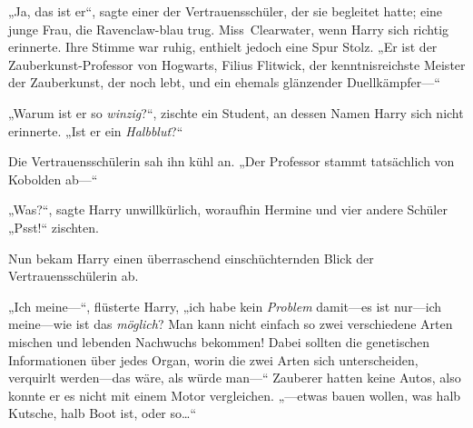 „Ja, das ist er“, sagte einer der Vertrauensschüler, der sie begleitet hatte; eine junge Frau, die Ravenclaw-blau trug. Miss~Clearwater, wenn Harry sich richtig erinnerte. Ihre Stimme war ruhig, enthielt jedoch eine Spur Stolz. „Er ist der Zauberkunst-Professor von Hogwarts, Filius Flitwick, der kenntnisreichste Meister der Zauberkunst, der noch lebt, und ein ehemals glänzender Duellkämpfer—“




„Warum ist er so \emph{winzig}?“, zischte ein Student, an dessen Namen Harry sich nicht erinnerte. „Ist er ein \emph{Halbblut}?“

Die Vertrauensschülerin sah ihn kühl an. „Der Professor stammt tatsächlich von Kobolden ab—“

„Was?“, sagte Harry unwillkürlich, woraufhin Hermine und vier andere Schüler „Psst!“ zischten.

Nun bekam Harry einen überraschend einschüchternden Blick der Vertrauensschülerin ab.

„Ich meine—“, flüsterte Harry, „ich habe kein \emph{Problem} damit—es ist nur—ich meine—wie ist das \emph{möglich}? Man kann nicht einfach so zwei verschiedene Arten mischen und lebenden Nachwuchs bekommen! Dabei sollten die genetischen Informationen über jedes Organ, worin die zwei Arten sich unterscheiden, verquirlt werden—das wäre, als würde man—“ Zauberer hatten keine Autos, also konnte er es nicht mit einem Motor vergleichen. „—etwas bauen wollen, was halb Kutsche, halb Boot ist, oder so…“

